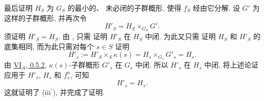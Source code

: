 最后证明 \(H_S\) 为 \(G_S\) 的最小的、
未必闭的子群概形, 使得 \(f_S\)
经由它分解. 设 \(G'\) 为这样的子群概形, 并再次令
\[
  H'_S=H_S\times_{G_S}G'.
\]
须证明 \(H'_S=H_S\). 由 \textup{}, 只需
证明 \(H'_S\) 在 \(H_S\) 中闭. 为此又只需
证明 \(H_S\) 和 \(H'_S\) 的底集相同,
而为此只需对每个 \(s\in S\) 证明
\[
  H'_s
  :=H'_S\times_S\kappa(s)
  =H_s\times_{G_s}G'_s
  =H_s.
\]
由 \hyperref[sga3:VIA:0.5.2]{VI\(_A\), 0.5.2},
\(\kappa(s)\)-子群概形 \(G'_s\) 在 \(G_s\) 中闭.
所以 \(H'_s\) 在 \(H_s\) 中闭, 将上述论证
应用于 \(H'_s\), \(H_s\) 和 \(f^n_s\), 可知
\[
  H'_s=H_s.
\]
这就证明了 \textup{(iii\(^{\prime}\))}, 并完成了证明.


